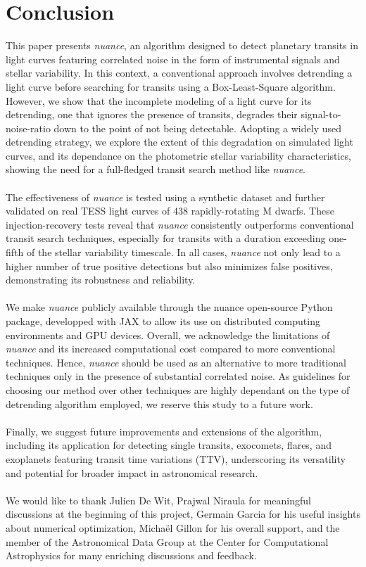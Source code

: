 \documentclass[modern]{aastex631}
\newcommand{\nuancemethod}{\textit{nuance}}
\newcommand{\nuancecode}{\textsf{nuance}}
\begin{document}
\section{Conclusion}\label{conclusion}
This paper presents \nuancemethod{}, an algorithm designed to detect planetary transits in light curves featuring correlated noise in the form of instrumental signals and stellar variability. In this context, a conventional approach involves detrending a light curve before searching for transits using a Box-Least-Square algorithm. However, we show that the incomplete modeling of a light curve for its detrending, one that ignores the presence of transits, degrades their signal-to-noise-ratio down to the point of not being detectable. Adopting a widely used detrending strategy, we explore the extent of this degradation on simulated light curves, and its dependance on the photometric stellar variability characteristics, showing the need for a full-fledged transit search method like \nuancemethod{}.\\\\
The effectiveness of \nuancemethod{} is tested using a synthetic dataset and further validated on real TESS light curves of 438 rapidly-rotating M dwarfs. These injection-recovery tests reveal that \nuancemethod{} consistently outperforms conventional transit search techniques, especially for transits with a duration exceeding one-fifth of the stellar variability timescale. In all cases, \nuancemethod{} not only lead to a higher number of true positive detections but also minimizes false positives, demonstrating its robustness and reliability.\\\\
We make \nuancemethod{} publicly available through the \nuancecode{} open-source Python package, developped with \textsf{JAX} to allow its  use on distributed computing environments and GPU devices. Overall, we acknowledge the limitations of \nuancemethod{} and its increased computational cost compared to more conventional techniques. Hence, \nuancemethod{} should be used as an alternative to more traditional techniques only in the presence of substantial correlated noise. As guidelines for choosing our method over other techniques are highly dependant on the type of detrending algorithm employed, we reserve this study to a future work.\\\\
Finally, we suggest future improvements and extensions of the algorithm, including its application for detecting single transits, exocomets, flares, and exoplanets featuring transit time variations (TTV), underscoring its versatility and potential for broader impact in astronomical research.
\\\\
\vfill{}
We would like to thank Julien De Wit, Prajwal Niraula for meaningful discussions at the beginning of this project, Germain Garcia for his useful insights about numerical optimization, Michaël Gillon for his overall support, and the member of the Astronomical Data Group at the Center for Computational Astrophysics for many enriching discussions and feedback.
\end{document}
